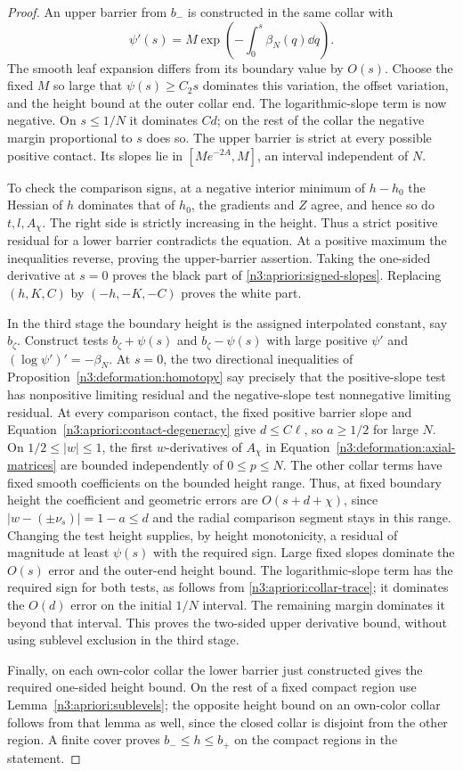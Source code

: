 \begin{proof}
An upper barrier from $b_-$ is constructed in the same collar with
\[
 \psi'(s)=M\exp\left(-\int_0^s\beta_N(q)\dd q\right).
\]
The smooth leaf expansion differs from its boundary value by $O(s)$.
Choose the fixed $M$ so large that
$\psi(s)\ge C_2s$ dominates this variation, the offset variation,
and the height bound at the outer collar end.  The logarithmic-slope
term is now negative.  On $s\le1/N$ it dominates $Cd$; on the rest
of the collar the negative margin proportional to $s$ does so.
The upper barrier is strict at every possible positive contact.
Its slopes lie in $[Me^{-2A},M]$, an interval independent of $N$.

To check the comparison signs, at a negative interior minimum of
$h-h_0$ the Hessian of $h$ dominates that of $h_0$, the gradients
and $Z$ agree, and hence so do $t,l,A_\chi$.  The right side is
strictly increasing in the height.  Thus a strict positive residual
for a lower barrier contradicts the equation.  At a positive maximum
the inequalities reverse, proving the upper-barrier assertion.
Taking the one-sided derivative at $s=0$ proves the black part of
\eqref{n3:apriori:signed-slopes}.  Replacing $(h,K,C)$ by
$(-h,-K,-C)$ proves the white part.

In the third stage the boundary height is the assigned interpolated
constant, say $b_\zeta$.  Construct tests
$b_\zeta+\psi(s)$ and $b_\zeta-\psi(s)$ with large positive
$\psi'$ and $(\log\psi')'=-\beta_N$.  At $s=0$, the two directional
inequalities of Proposition~\ref{n3:deformation:homotopy} say precisely
that the positive-slope test has nonpositive limiting residual and
the negative-slope test nonnegative limiting residual.  At every
comparison contact, the fixed positive barrier slope and
Equation~\eqref{n3:apriori:contact-degeneracy} give $d\le C\ell$, so
$a\ge1/2$ for large $N$.  On $1/2\le|w|\le1$, the first
$w$-derivatives of $A_\chi$ in
Equation~\eqref{n3:deformation:axial-matrices} are bounded independently
of $0\le p\le N$.  The other collar terms have fixed smooth
coefficients on the bounded height range.  Thus, at fixed boundary
height the coefficient and geometric errors are $O(s+d+\chi)$,
since $|w-(\pm\nu_s)|=1-a\le d$ and the radial comparison segment stays
in this range.  Changing the test height supplies, by height
monotonicity, a residual of magnitude at least $\psi(s)$ with the
required sign.  Large fixed slopes dominate the $O(s)$ error and
the outer-end height bound.  The logarithmic-slope term has the
required sign for both tests, as follows from
\eqref{n3:apriori:collar-trace}; it dominates the $O(d)$ error on the
initial $1/N$ interval.  The remaining margin dominates it beyond
that interval.  This proves the two-sided upper derivative bound,
without using sublevel exclusion in the third stage.

Finally, on each own-color collar the lower barrier just constructed
gives the required one-sided height bound.  On the rest of a fixed
compact region use Lemma~\ref{n3:apriori:sublevels}; the opposite height
bound on an own-color collar follows from that lemma as well, since
the closed collar is disjoint from the other region.  A finite cover
proves $b_-\le h\le b_+$ on the compact regions in the statement.
\end{proof}

